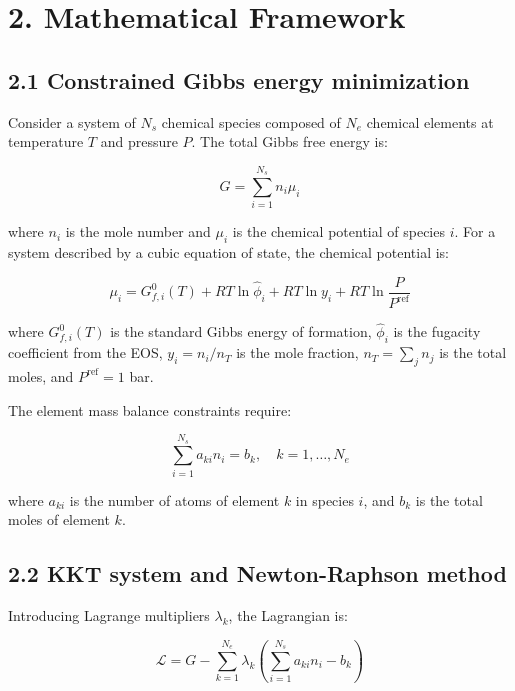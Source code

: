 \documentclass[review,3p]{elsarticle}
\begin{document}
\section{2. Mathematical Framework}



\subsection{2.1 Constrained Gibbs energy minimization}

Consider a system of $N_s$ chemical species composed of $N_e$ chemical elements at temperature $T$ and pressure $P$. The total Gibbs free energy is:

\begin{equation}
G = \sum_{i=1}^{N_s} n_i \mu_i
\end{equation}

where $n_i$ is the mole number and $\mu_i$ is the chemical potential of species $i$. For a system described by a cubic equation of state, the chemical potential is:

\begin{equation}
\mu_i = G_{f,i}^0(T) + RT \ln \hat{\phi}_i + RT \ln y_i + RT \ln \frac{P}{P^{\mathrm{ref}}}
\end{equation}

where $G_{f,i}^0(T)$ is the standard Gibbs energy of formation, $\hat{\phi}_i$ is the fugacity coefficient from the EOS, $y_i = n_i / n_T$ is the mole fraction, $n_T = \sum_j n_j$ is the total moles, and $P^{\mathrm{ref}} = 1$ bar.

The element mass balance constraints require:

\begin{equation}
\sum_{i=1}^{N_s} a_{ki} n_i = b_k, \quad k = 1, \ldots, N_e
\end{equation}

where $a_{ki}$ is the number of atoms of element $k$ in species $i$, and $b_k$ is the total moles of element $k$.

\subsection{2.2 KKT system and Newton-Raphson method}

Introducing Lagrange multipliers $\lambda_k$, the Lagrangian is:

\begin{equation}
\mathcal{L} = G - \sum_{k=1}^{N_e} \lambda_k \left( \sum_{i=1}^{N_s} a_{ki} n_i - b_k \right)
\end{equation}
\end{document}
